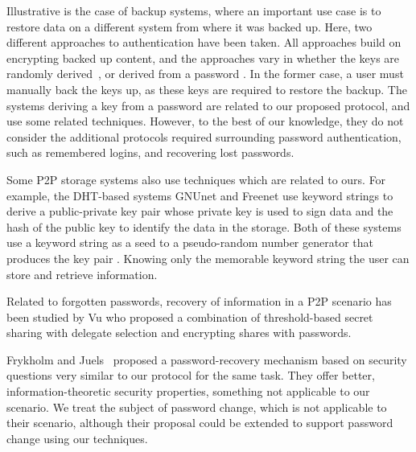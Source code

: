 Illustrative is the case of backup systems, where an important use case is to
restore data on a different system from where it was backed up. Here, two
different approaches to authentication have been taken. All approaches build
on encrypting backed up content, and the approaches vary in whether the keys
are randomly derived~\cite{LillibridgeEBBI03}, or derived from a password
\cite{CoxMN02}. In the former case, a user must manually
back the keys up, as these keys are required to restore the backup. The
systems deriving a key from a password are related to our proposed protocol,
and use some related techniques. However, to the best of our knowledge, they
do not consider the additional protocols required surrounding password
authentication, such as remembered logins, and recovering lost passwords.

Some P2P storage systems also use techniques which are related to ours.
For example, the DHT-based systems 
GNUnet and Freenet use keyword strings to derive a public-private key pair
whose private key is used to sign data and the hash of the public key to
identify the data in the storage. Both of these systems use a keyword string
as a seed to a pseudo-random number generator that produces the key pair
\cite{Clarke10,Bennett03}. Knowing only the memorable keyword string the user
can store and retrieve information.


Related to forgotten passwords, recovery of information in a
P2P scenario has been studied by Vu\etal \cite{Vu_Aberer_Buchegger_Datta_2009}
who proposed a combination of threshold-based secret sharing with delegate
selection and encrypting shares with passwords.

Frykholm and Juels~\cite{FrykholmJ01} proposed a password-recovery mechanism
based on security questions very similar to our protocol for the same task.
They offer better, information-theoretic security properties, something
not applicable to our scenario. %
We treat the subject of password change, which is not
applicable to their scenario, although their proposal could be extended to support
password change using our techniques.


